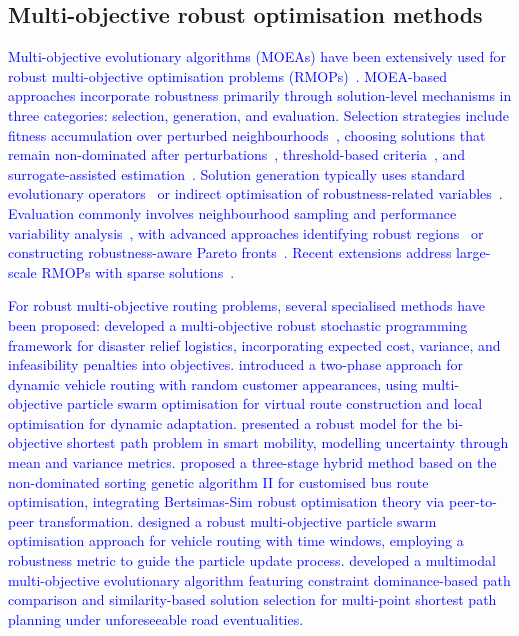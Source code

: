 \documentclass{article}
\newcommand*{\blue}{\textcolor{blue}}
\begin{document}
\subsection{Multi-objective robust optimisation methods}

\blue{Multi-objective evolutionary algorithms (MOEAs) have been extensively used for robust multi-objective optimisation problems (RMOPs)~\cite{41}. MOEA-based approaches incorporate robustness primarily through solution-level mechanisms in three categories: selection, generation, and evaluation. Selection strategies include fitness accumulation over perturbed neighbourhoods~\cite{42,43}, choosing solutions that remain non-dominated after perturbations~\cite{30}, threshold-based criteria~\cite{40}, and surrogate-assisted estimation~\cite{45}. Solution generation typically uses standard evolutionary operators~\cite{46,47} or indirect optimisation of robustness-related variables~\cite{30}. Evaluation commonly involves neighbourhood sampling and performance variability analysis~\cite{30,40,43}, with advanced approaches identifying robust regions~\cite{29} or constructing robustness-aware Pareto fronts~\cite{48}. Recent extensions address large-scale RMOPs with sparse solutions~\cite{49}.} 

\blue{For robust multi-objective routing problems, several specialised methods have been proposed: \cite{bozorgi2013multi} developed a multi-objective robust stochastic programming framework for disaster relief logistics, incorporating expected cost, variance, and infeasibility penalties into objectives. \cite{guo2017robust} introduced a two-phase approach for dynamic vehicle routing with random customer appearances, using multi-objective particle swarm optimisation for virtual route construction and local optimisation for dynamic adaptation. \cite{cintrano2019facing} presented a robust model for the bi-objective shortest path problem in smart mobility, modelling uncertainty through mean and variance metrics. \cite{ma2020multi} proposed a three-stage hybrid method based on the non-dominated sorting genetic algorithm II for customised bus route optimisation, integrating Bertsimas-Sim robust optimisation theory via peer-to-peer transformation. \cite{duan2021robust} designed a robust multi-objective particle swarm optimisation approach for vehicle routing with time windows, employing a robustness metric to guide the particle update process. \cite{xu2025multi} developed a multimodal multi-objective evolutionary algorithm featuring constraint dominance-based path comparison and similarity-based solution selection for multi-point shortest path planning under unforeseeable road eventualities.}
\end{document}
